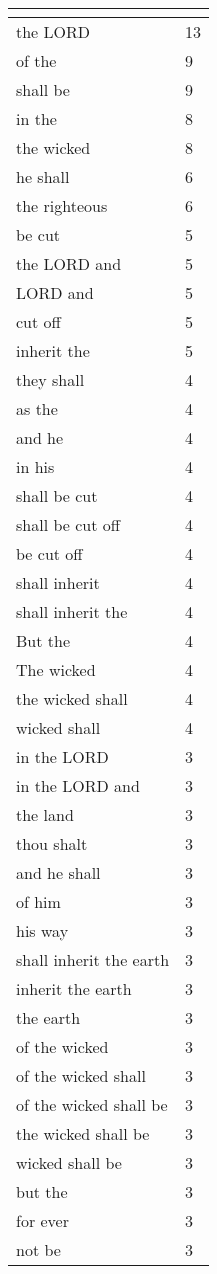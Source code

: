 \begin{center}
\begin{longtable}{|p{3.0in}|p{0.5in}|}
\hline \multicolumn{2}{c}{{ }} \\ \hline
\endfoot 
the LORD & 13\\ \hline 
of the & 9\\ \hline 
shall be & 9\\ \hline 
in the & 8\\ \hline 
the wicked & 8\\ \hline 
he shall & 6\\ \hline 
the righteous & 6\\ \hline 
be cut & 5\\ \hline 
the LORD and & 5\\ \hline 
LORD and & 5\\ \hline 
cut off & 5\\ \hline 
inherit the & 5\\ \hline 
they shall & 4\\ \hline 
as the & 4\\ \hline 
and he & 4\\ \hline 
in his & 4\\ \hline 
shall be cut & 4\\ \hline 
shall be cut off & 4\\ \hline 
be cut off & 4\\ \hline 
shall inherit & 4\\ \hline 
shall inherit the & 4\\ \hline 
But the & 4\\ \hline 
The wicked & 4\\ \hline 
the wicked shall & 4\\ \hline 
wicked shall & 4\\ \hline 
in the LORD & 3\\ \hline 
in the LORD and & 3\\ \hline 
the land & 3\\ \hline 
thou shalt & 3\\ \hline 
and he shall & 3\\ \hline 
of him & 3\\ \hline 
his way & 3\\ \hline 
shall inherit the earth & 3\\ \hline 
inherit the earth & 3\\ \hline 
the earth & 3\\ \hline 
of the wicked & 3\\ \hline 
of the wicked shall & 3\\ \hline 
of the wicked shall be & 3\\ \hline 
the wicked shall be & 3\\ \hline 
wicked shall be & 3\\ \hline 
but the & 3\\ \hline 
for ever & 3\\ \hline 
not be & 3\\ \hline 
\end{longtable}
\end{center}





